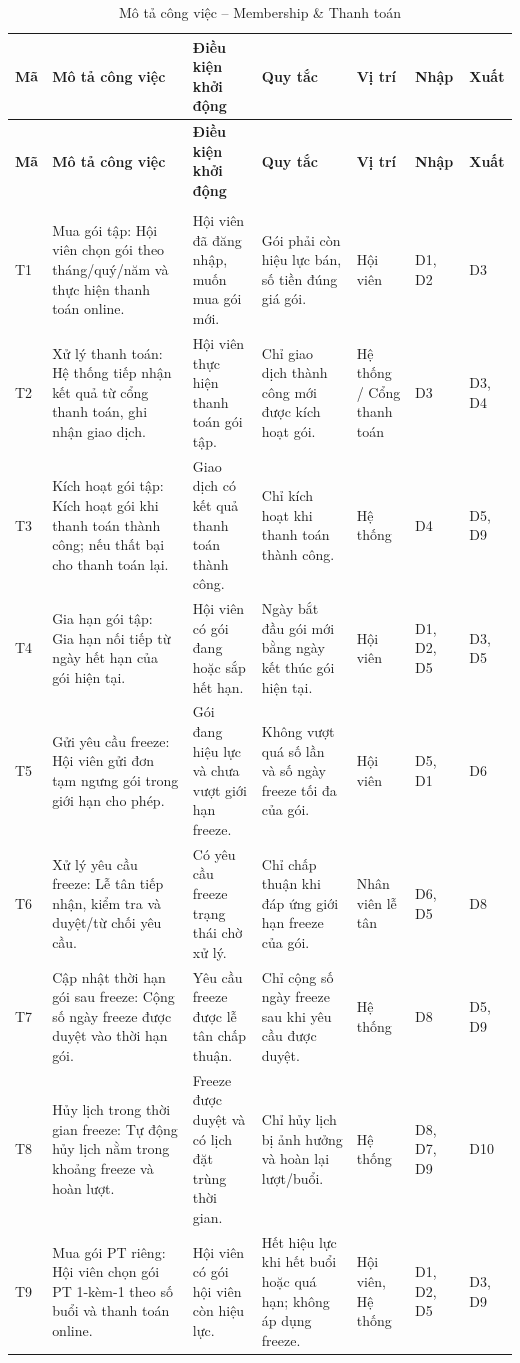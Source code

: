 \documentclass[a4paper,12pt]{article}
\begin{document}
{\setlength{\tabcolsep}{4pt}
\begin{longtable}{|L{0.9cm}|L{4.0cm}|L{2.5cm}|L{2.9cm}|L{1.7cm}|L{1.4cm}|L{1.4cm}|}
\hline \textbf{Mã} & \textbf{Mô tả công việc} & \textbf{Điều kiện khởi động} & \textbf{Quy tắc} & \textbf{Vị trí} & \textbf{Nhập} & \textbf{Xuất} \\ \hline \endfirsthead
\hline \textbf{Mã} & \textbf{Mô tả công việc} & \textbf{Điều kiện khởi động} & \textbf{Quy tắc} & \textbf{Vị trí} & \textbf{Nhập} & \textbf{Xuất} \\ \hline \endhead \hline \endfoot
\hline
\caption{Mô tả công việc -- Membership \& Thanh toán} \\
\endlastfoot
T1 & Mua gói tập: Hội viên chọn gói theo tháng/quý/năm và thực hiện thanh toán online. & Hội viên đã đăng nhập, muốn mua gói mới. & Gói phải còn hiệu lực bán, số tiền đúng giá gói. & Hội viên & D1, D2 & D3 \\ \hline
T2 & Xử lý thanh toán: Hệ thống tiếp nhận kết quả từ cổng thanh toán, ghi nhận giao dịch. & Hội viên thực hiện thanh toán gói tập. & Chỉ giao dịch thành công mới được kích hoạt gói. & Hệ thống / Cổng thanh toán & D3 & D3, D4 \\ \hline
T3 & Kích hoạt gói tập: Kích hoạt gói khi thanh toán thành công; nếu thất bại cho thanh toán lại. & Giao dịch có kết quả thanh toán thành công. & Chỉ kích hoạt khi thanh toán thành công. & Hệ thống & D4 & D5, D9 \\ \hline
T4 & Gia hạn gói tập: Gia hạn nối tiếp từ ngày hết hạn của gói hiện tại. & Hội viên có gói đang hoặc sắp hết hạn. & Ngày bắt đầu gói mới bằng ngày kết thúc gói hiện tại. & Hội viên & D1, D2, D5 & D3, D5 \\ \hline
T5 & Gửi yêu cầu freeze: Hội viên gửi đơn tạm ngưng gói trong giới hạn cho phép. & Gói đang hiệu lực và chưa vượt giới hạn freeze. & Không vượt quá số lần và số ngày freeze tối đa của gói. & Hội viên & D5, D1 & D6 \\ \hline
T6 & Xử lý yêu cầu freeze: Lễ tân tiếp nhận, kiểm tra và duyệt/từ chối yêu cầu. & Có yêu cầu freeze trạng thái chờ xử lý. & Chỉ chấp thuận khi đáp ứng giới hạn freeze của gói. & Nhân viên lễ tân & D6, D5 & D8 \\ \hline
T7 & Cập nhật thời hạn gói sau freeze: Cộng số ngày freeze được duyệt vào thời hạn gói. & Yêu cầu freeze được lễ tân chấp thuận. & Chỉ cộng số ngày freeze sau khi yêu cầu được duyệt. & Hệ thống & D8 & D5, D9 \\ \hline
T8 & Hủy lịch trong thời gian freeze: Tự động hủy lịch nằm trong khoảng freeze và hoàn lượt. & Freeze được duyệt và có lịch đặt trùng thời gian. & Chỉ hủy lịch bị ảnh hưởng và hoàn lại lượt/buổi. & Hệ thống & D8, D7, D9 & D10 \\ \hline
T9 & Mua gói PT riêng: Hội viên chọn gói PT 1-kèm-1 theo số buổi và thanh toán online. & Hội viên có gói hội viên còn hiệu lực. & Hết hiệu lực khi hết buổi hoặc quá hạn; không áp dụng freeze. & Hội viên, Hệ thống & D1, D2, D5 & D3, D9 \\ \hline
\end{longtable}
}
\end{document}
